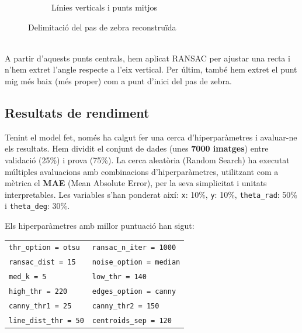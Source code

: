 \documentclass[10pt,a4paper,twocolumn,twoside]{article}
\begin{document}
\begin{figure}[h]
\begin{subfigure}{0.46\columnwidth}
		\caption{Línies verticals i punts mitjos}
	\end{subfigure}
	\caption{Delimitació del pas de zebra reconstruïda}
	\label{fig:lines}
\end{figure}
\\
A partir d’aquests punts centrals, hem aplicat RANSAC per ajustar una recta i n’hem extret l’angle respecte a l’eix vertical. Per últim, també hem extret el punt mig més baix (més proper) com a punt d'inici del pas de zebra.

\subsection{Resultats de rendiment}

Tenint el model fet, només ha calgut fer una cerca d’hiperparàmetres i avaluar-ne els resultats. Hem dividit el conjunt de dades (unes \textbf{7000 imatges}) entre validació (25\%) i prova (75\%). La cerca aleatòria (Random Search) ha executat múltiples avaluacions amb combinacions d’hiperparàmetres, utilitzant com a mètrica el \textbf{MAE} (Mean Absolute Error), per la seva simplicitat i unitats interpretables. Les variables s’han ponderat així: \texttt{x}: 10\%, \texttt{y}: 10\%, \texttt{theta\_rad}: 50\% i \texttt{theta\_deg}: 30\%.

\vspace*{0.5em}
\noindent
Els hiperparàmetres amb millor puntuació han sigut:

\noindent
{\small
\begin{tabularx}{\columnwidth}{X X}
\texttt{thr\_option = otsu} & \texttt{ransac\_n\_iter = 1000} \\
\texttt{ransac\_dist = 15} & \texttt{noise\_option = median} \\
\texttt{med\_k = 5} & \texttt{low\_thr = 140} \\
\texttt{high\_thr = 220} & \texttt{edges\_option = canny} \\
\texttt{canny\_thr1 = 25} & \texttt{canny\_thr2 = 150} \\
\texttt{line\_dist\_thr = 50} & \texttt{centroids\_sep = 120} \\
\end{tabularx}
}
\end{document}
